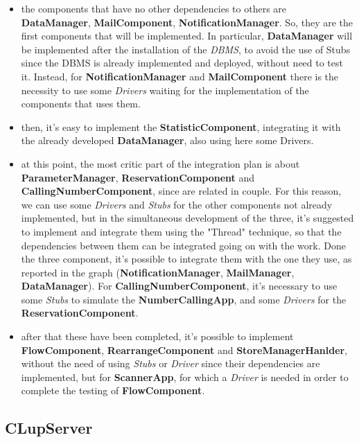 \documentclass{article}
\begin{document}
		\begin{itemize}
		\item the components that have no other dependencies to others are {\bfseries DataManager}, {\bfseries MailComponent}, {\bfseries NotificationManager}. So, they are the first components that will be implemented. In particular,  {\bfseries DataManager} will be implemented after the installation of 			the \emph{DBMS}, to avoid the use of Stubs since the DBMS is already implemented and deployed, without need to test it. Instead, for {\bfseries NotificationManager} and {\bfseries MailComponent} there is the necessity to use some \emph{Drivers} waiting for the implementation of the components that uses them.  
		\item then, it's easy to implement the {\bfseries StatisticComponent}, integrating it with the already developed {\bfseries DataManager}, also using here some Drivers.
		\item at this point, the most critic part of the integration plan is about {\bfseries ParameterManager}, {\bfseries ReservationComponent} and {\bfseries CallingNumberComponent}, since are related in couple. For this reason, we can use some \emph{Drivers} and \emph{Stubs} for the other components not already implemented, but in the simultaneous development of the three, it's suggested to implement and integrate them using the "Thread" technique, so that the dependencies between them can be integrated going on with the work. Done the three component, it's possible to integrate them with the one they use, as reported in the graph ({\bfseries NotificationManager}, {\bfseries MailManager}, {\bfseries DataManager}). For {\bfseries CallingNumberComponent}, it's necessary to use some \emph{Stubs} to simulate the {\bfseries NumberCallingApp}, and some \emph{Drivers} for the {\bfseries ReservationComponent}.
		\item after that these have been completed, it's possible to implement {\bfseries FlowComponent}, {\bfseries RearrangeComponent} and {\bfseries StoreManagerHanlder}, without the need of using \emph{Stubs} or \emph{Driver} since their dependencies are implemented, but for {\bfseries ScannerApp}, for which a \emph{Driver} is needed in order to complete the testing of {\bfseries FlowComponent}.
		 \end{itemize}     
		 
		\subsection{CLupServer}
		
\end{document}
